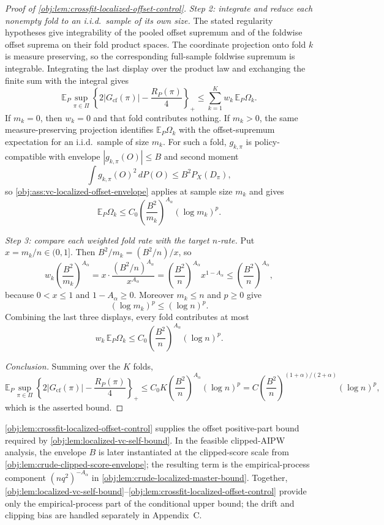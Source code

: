 \documentclass[11pt]{article}
\begin{document}
\begin{proof}[Proof of \cref{obj:lem:crossfit-localized-offset-control}]
\emph{Step 2: integrate and reduce each nonempty fold to an i.i.d.\ sample of its own size.}  The stated regularity hypotheses give integrability of the pooled offset supremum and of the foldwise offset suprema on their fold product spaces.  The coordinate projection onto fold \(k\) is measure preserving, so the corresponding full-sample foldwise supremum is integrable.  Integrating the last display over the product law and exchanging the finite sum with the integral gives
\[
\mathbb E_P\sup_{\pi\in\Pi}\left\{2\left|G_{\mathrm{cf}}(\pi)\right|-\frac{R_P(\pi)}4\right\}_+
\le
\sum_{k=1}^K w_k\,\mathbb E_P\Omega_k .
\]
If \(m_k=0\), then \(w_k=0\) and that fold contributes nothing.  If \(m_k>0\), the same measure-preserving projection identifies \(\mathbb E_P\Omega_k\) with the offset-supremum expectation for an i.i.d.\ sample of size \(m_k\).  For such a fold, \(g_{k,\pi}\) is policy-compatible with envelope \(|g_{k,\pi}(O)|\le B\) and second moment
\[
\int g_{k,\pi}(O)^2\,dP(O)\le B^2P_X(D_\pi),
\]
so \cref{obj:ass:vc-localized-offset-envelope} applies at sample size \(m_k\) and gives
\[
\mathbb E_P\Omega_k
\le
C_0\left(\frac{B^2}{m_k}\right)^{A_\alpha}(\log m_k)^p .
\]

\emph{Step 3: compare each weighted fold rate with the target \(n\)-rate.}  Put \(x=m_k/n\in(0,1]\).  Then \(B^2/m_k=(B^2/n)/x\), so
\[
w_k\left(\frac{B^2}{m_k}\right)^{A_\alpha}
=
x\cdot\frac{(B^2/n)^{A_\alpha}}{x^{A_\alpha}}
=
\left(\frac{B^2}{n}\right)^{A_\alpha}x^{1-A_\alpha}
\le
\left(\frac{B^2}{n}\right)^{A_\alpha},
\]
because \(0<x\le1\) and \(1-A_\alpha\ge0\).  Moreover \(m_k\le n\) and \(p\ge0\) give
\[
(\log m_k)^p\le(\log n)^p .
\]
Combining the last three displays, every fold contributes at most
\[
w_k\,\mathbb E_P\Omega_k
\le
C_0\left(\frac{B^2}{n}\right)^{A_\alpha}(\log n)^p .
\]

\emph{Conclusion.}  Summing over the \(K\) folds,
\[
\mathbb E_P\sup_{\pi\in\Pi}
\left\{2\lvert G_{\mathrm{cf}}(\pi)\rvert-\frac{R_P(\pi)}{4}\right\}_{+}
\le
C_0K\left(\frac{B^2}{n}\right)^{A_\alpha}(\log n)^p
=
C\left(\frac{B^2}{n}\right)^{(1+\alpha)/(2+\alpha)}(\log n)^p ,
\]
which is the asserted bound. %
\end{proof}

\cref{obj:lem:crossfit-localized-offset-control} supplies the offset positive-part bound required by \cref{obj:lem:localized-vc-self-bound}.  In the feasible clipped-AIPW analysis, the envelope \(B\) is later instantiated at the clipped-score scale from \cref{obj:lem:crude-clipped-score-envelope}; the resulting term is the empirical-process component \((nq^2)^{-A_\alpha}\) in \cref{obj:lem:crude-localized-master-bound}.  Together, \cref{obj:lem:localized-vc-self-bound}--\cref{obj:lem:crossfit-localized-offset-control} provide only the empirical-process part of the conditional upper bound; the drift and clipping bias are handled separately in Appendix~C.
\end{document}
